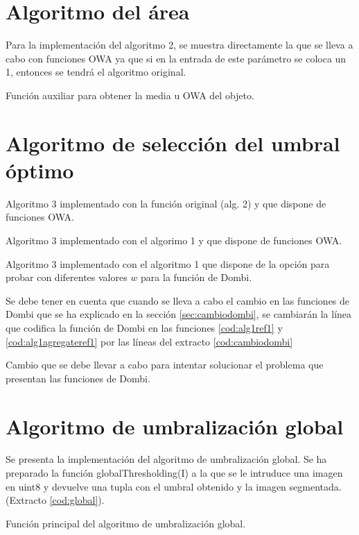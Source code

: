 \section{Algoritmo del área}
Para la implementación del algoritmo 2, se muestra directamente la que se lleva a cabo con funciones OWA ya que si en la entrada de este parámetro se coloca un 1, entonces se tendrá el algoritmo original.
\begin{listing}
    \caption{Función auxiliar para obtener la media u OWA del objeto.\label{cod:alg2}}
\end{listing}

\section{Algoritmo de selección del umbral óptimo}
\begin{listing}
    \caption{Algoritmo 3 implementado con la función original (alg. 2) y que dispone de funciones OWA.\label{cod:alg3a}}
\end{listing}
\begin{listing}
    \caption{Algoritmo 3 implementado con el algorimo 1 y que dispone de funciones OWA.\label{cod:alg3b}}
\end{listing}
\begin{listing}
    \caption{Algoritmo 3 implementado con el algoritmo 1 que dispone de la opción para probar con diferentes valores $w$ para la función de Dombi.\label{cod:alg3c}}
\end{listing}


Se debe tener en cuenta que cuando se lleva a cabo el cambio en las funciones de Dombi que se ha explicado en la sección \ref{sec:cambiodombi}, se cambiarán la línea que codifica la función de Dombi en las funciones \ref{cod:alg1ref1} y \ref{cod:alg1agregateref1} por las líneas del extracto \ref{cod:cambiodombi}
\begin{listing}
    \caption{Cambio que se debe llevar a cabo para intentar solucionar el problema que presentan las funciones de Dombi.\label{cod:cambiodombi}}
\end{listing}

\section{Algoritmo de umbralización global}
Se presenta la implementación del algoritmo de umbralización global. Se ha preparado la función {\ttfamily globalThresholding(I)} a la que se le intruduce una imagen en {\ttfamily uint8} y devuelve una tupla con el umbral obtenido y la imagen segmentada. (Extracto \ref{cod:global}).
\begin{listing}
    \caption{Función principal del algoritmo de umbralización global.\label{cod:global}}
\end{listing}


